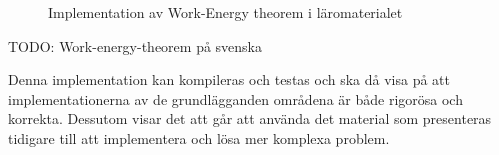 \begin{draft}
\begin{figure}[tph]
  \centering
  \caption{Implementation av Work-Energy theorem i läromaterialet}
  \label{fig:komposit-ex}
\end{figure}

TODO: Work-energy-theorem på svenska

Denna implementation kan kompileras och testas och ska då visa på att
implementationerna av de grundlägganden områdena är både rigorösa och korrekta.
Dessutom visar det att går att använda det material som presenteras tidigare
till  att implementera och lösa mer komplexa problem.

\end{draft}

